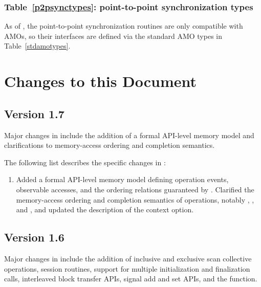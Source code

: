 \subsection{Table~\ref{p2psynctypes}: point-to-point synchronization types}
\label{dep:p2p_sync_types}
As of , the point-to-point synchronization routines are only
compatible with \acp{AMO}, so their interfaces are defined via the
standard \ac{AMO} types in Table~\ref{stdamotypes}.




\chapter{Changes to this Document}\label{sec:changelog}

\section{Version 1.7}
\label{changelog:v1.7}
Major changes in \openshmem[1.7] include the addition of a formal
API-level memory model and clarifications to memory-access ordering and
completion semantics.

The following list describes the specific changes in \openshmem[1.7]:
\begin{enumerate}
%
\item Added a formal API-level memory model defining operation events,
    observable accesses, and the ordering relations guaranteed by
    \openshmem. Clarified the memory-access ordering and completion semantics
    of \openshmem operations, notably , , and
    , and updated the description of the
     context option.
%
%
\end{enumerate}

\section{Version 1.6}
\label{changelog:v1.6}
Major changes in \openshmem[1.6] include the addition of inclusive and
exclusive scan collective operations, session routines, support for multiple
initialization and finalization calls, interleaved block transfer APIs,
signal add and set APIs, and the
 function.

